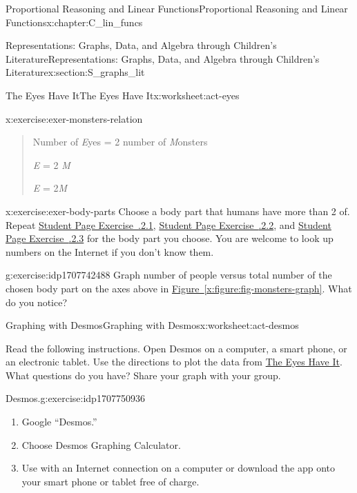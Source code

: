 \documentclass[oneside,10pt,]{book}
\newcommand{\xreffont}{\relax}
\numberwithin{equation}{chapter}
\begin{document}
\begin{chapterptx}{Proportional Reasoning and Linear Functions}{}{Proportional Reasoning and Linear Functions}{}{}{x:chapter:C_lin_funcs}
\begin{sectionptx}{Representations: Graphs, Data, and Algebra through Children's Literature}{}{Representations: Graphs, Data, and Algebra through Children's Literature}{}{}{x:section:S_graphs_lit}
\begin{worksheet-subsection}{The Eyes Have It}{}{The Eyes Have It}{}{}{x:worksheet:act-eyes}
\begin{divisionexercise}{3}{}{}{x:exercise:exer-monsters-relation}
\begin{quote}
\par
Number of \emph{E}yes = 2 \texttimes{} number of \emph{M}onsters%
\par
\emph{E} = 2 \texttimes{} \emph{M}%
\par
\emph{E} = 2\emph{M}%
\end{quote}
%
\end{divisionexercise}%
\begin{divisionexercise}{4}{}{}{x:exercise:exer-body-parts}%
Choose a body part that humans have more than 2 of. Repeat \hyperlink{x:exercise:exer-monsters-1}{Student Page Exercise~{\xreffont 2.1.2.1}}, \hyperlink{x:exercise:exer-monsters-graph}{Student Page Exercise~{\xreffont 2.1.2.2}}, and \hyperlink{x:exercise:exer-monsters-relation}{Student Page Exercise~{\xreffont 2.1.2.3}} for the body part you choose. You are welcome to look up numbers on the Internet if you don't know them.%
\end{divisionexercise}%
\begin{divisionexercise}{5}{}{}{g:exercise:idp1707742488}%
Graph number of people versus total number of the chosen body part on the axes above in \hyperref[x:figure:fig-monsters-graph]{Figure~{\xreffont\ref{x:figure:fig-monsters-graph}}}. What do you notice?%
\end{divisionexercise}%
\end{worksheet-subsection}
\restoregeometry
%
%
\typeout{************************************************}
\typeout{************************************************}
%
\begin{worksheet-subsection}{Graphing with Desmos}{}{Graphing with Desmos}{}{}{x:worksheet:act-desmos}
\begin{introduction}{}%
Read the following instructions. Open Desmos on a computer, a smart phone, or an electronic tablet. Use the directions to plot the data from \hyperref[x:worksheet:act-eyes]{The Eyes Have It}. What questions do you have? Share your graph with your group.%
\end{introduction}%
\begin{divisionexercise}{1}{Desmos.}{}{g:exercise:idp1707750936}%
\begin{enumerate}[font=\bfseries,label=(\alph*),ref=\alph*]
\item{}Google ``Desmos.''%
\item{}Choose Desmos Graphing Calculator.%
\item{}Use with an Internet connection on a computer or download the app onto your smart phone or tablet free of charge.%

\end{enumerate}
\end{divisionexercise}
\end{worksheet-subsection}
\end{sectionptx}
\end{chapterptx}
\end{document}
